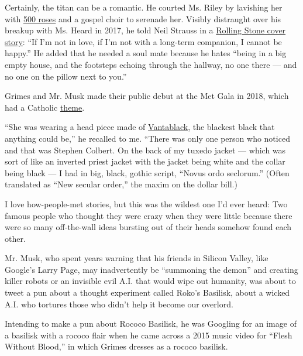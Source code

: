 Certainly, the titan can be a romantic. He courted Ms. Riley by
lavishing her with
\href{https://www.standard.co.uk/lifestyle/talulah-riley-how-to-marry-a-billionaire-6540732.html}{500
roses} and a gospel choir to serenade her. Visibly distraught over his
breakup with Ms. Heard in 2017, he told Neil Strauss in a
\href{https://www.rollingstone.com/culture/culture-features/elon-musk-the-architect-of-tomorrow-120850/}{Rolling
Stone cover story}: ``If I'm not in love, if I'm not with a long-term
companion, I cannot be happy.'' He added that he needed a soul mate
because he hates ``being in a big empty house, and the footsteps echoing
through the hallway, no one there --- and no one on the pillow next to
you.''

Grimes and Mr. Musk made their public debut at the Met Gala in 2018,
which had a Catholic
\href{https://www.vogue.com/article/met-gala-2018-heavenly-bodies-fashion-and-the-catholic-imagination-vogue-may-2018-issue}{theme}.

``She was wearing a head piece made of
\href{https://www.nytimes3xbfgragh.onion/2014/11/06/garden/what-you-can-do-with-vantablack-the-darkest-material-ever-made.html}{Vantablack},
the blackest black that anything could be,'' he recalled to me. ``There
was only one person who noticed and that was Stephen Colbert. On the
back of my tuxedo jacket --- which was sort of like an inverted priest
jacket with the jacket being white and the collar being black --- I had
in big, black, gothic script, ``Novus ordo seclorum.'' (Often translated
as ``New secular order,'' the maxim on the dollar bill.)

I love how-people-met stories, but this was the wildest one I'd ever
heard: Two famous people who thought they were crazy when they were
little because there were so many off-the-wall ideas bursting out of
their heads somehow found each other.

Mr. Musk, who spent years warning that his friends in Silicon Valley,
like Google's Larry Page, may inadvertently be ``summoning the demon''
and creating killer robots or an invisible evil A.I. that would wipe out
humanity, was about to tweet a pun about a thought experiment called
Roko's Basilisk, about a wicked A.I. who tortures those who didn't help
it become our overlord.

Intending to make a pun about Rococo Basilisk, he was Googling for an
image of a basilisk with a rococo flair when he came across a 2015 music
video for ``Flesh Without Blood,'' in which Grimes dresses as a rococo
basilisk.

